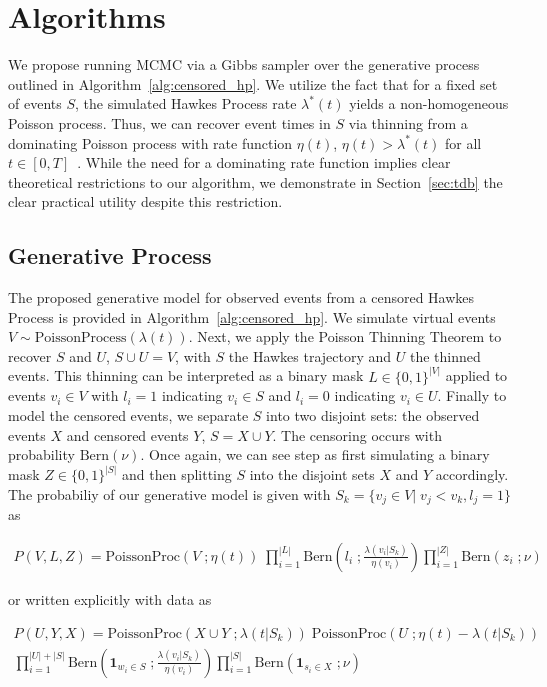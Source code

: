 \documentclass[11pt]{article}
\begin{document}
\section{Algorithms}

We propose running MCMC via a Gibbs sampler over the generative process outlined in Algorithm~\ref{alg:censored_hp}. We utilize the fact that for a fixed set of events $S$, the simulated Hawkes Process rate $\lambda^*(t)$ yields a non-homogeneous Poisson process. Thus, we can recover event times in $S$ via thinning from a dominating Poisson process with rate function $\eta(t)$, $\eta(t) > \lambda^*(t)$ for all $t \in [0,T]$~\cite{pthin}. While the need for a dominating rate function implies clear theoretical restrictions to our algorithm, we demonstrate in Section~\ref{sec:tdb} the clear practical utility despite this restriction.

\subsection{Generative Process}


The proposed generative model for observed events from a censored Hawkes Process is provided in Algorithm~\ref{alg:censored_hp}. We simulate virtual events $V\sim \text{PoissonProcess}(\lambda(t))$. Next, we apply the Poisson Thinning Theorem to recover $S$ and $U$, $S \cup U = V$, with $S$ the Hawkes trajectory and $U$ the thinned events. This thinning can be interpreted as a binary mask $L \in \{0,1\}^{|V|}$ applied to events $v_i \in V$ with $l_i = 1$ indicating $v_i \in S$ and $l_i = 0$ indicating $v_i \in U$. Finally to model the censored events, we separate $S$ into two disjoint sets: the observed events $X$ and censored events $Y$, $S = X \cup Y$. The censoring occurs with probability $\text{Bern}(\nu)$. Once again, we can see step as first simulating a binary mask $Z \in \{0,1\}^{|S|}$ and then splitting $S$ into the disjoint sets $X$ and $Y$ accordingly. The probabiliy of our generative model is given with  $S_k = \{v_j \in V |\; v_j < v_k, l_j = 1\}$ as

\begin{align}
P(V,L,Z)
=
\text{PoissonProc}(V\;;\eta(t))\;
\prod_{i=1}^{|L|} \text{Bern}\left(l_i\;;\frac{\lambda(v_i | S_k)}{\eta(v_i)}\right)
\prod_{i=1}^{|Z|} \text{Bern}(z_i\;;\nu)
\end{align}

\noindent or written explicitly with data as

\begin{align}
  P(U,Y,X)
  =
  \text{PoissonProc}(X \cup Y\;;\lambda(t|S_k))\;
  \text{PoissonProc}(U\;;\eta(t) - \lambda(t|S_k))\; \nonumber \\
  \prod_{i=1}^{|U| + |S|} \text{Bern}\left(\mathbf{1}_{w_i \in S}\;;\frac{\lambda(v_i | S_k)}{\eta(v_i)}\right)  
  \prod_{i=1}^{|S|} \text{Bern}(\mathbf{1}_{s_i \in X}\;;\nu)
\end{align}
\end{document}

